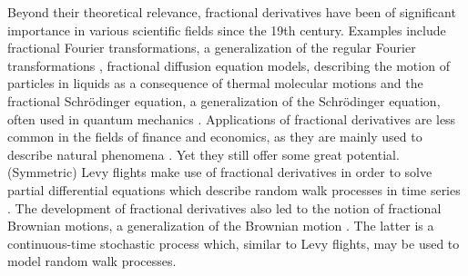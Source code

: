 Beyond their theoretical relevance, fractional derivatives have been of significant importance in various scientific fields since the 19th century. Examples include fractional Fourier transformations, a generalization of the regular Fourier transformations \citep{missbauer2012}, fractional diffusion equation models, describing the motion of particles in liquids as a consequence of thermal molecular motions \citep{einstein1905} and the fractional Schrödinger equation, a generalization of the Schrödinger equation, often used in quantum mechanics \citep{laskin2002}. Applications of fractional derivatives are less common in the fields of finance and economics, as they are mainly used to describe natural phenomena \citep{boulaaras2023}. Yet they still offer some great potential. (Symmetric) Levy flights make use of fractional derivatives in order to solve partial differential equations which describe random walk processes in time series \citep{scalas2000}. The development of fractional derivatives also led to the notion of fractional Brownian motions, a generalization of the Brownian motion \citep{mandelbrot1968}. The latter is a continuous-time stochastic process which, similar to Levy flights, may be used to model random walk processes.
